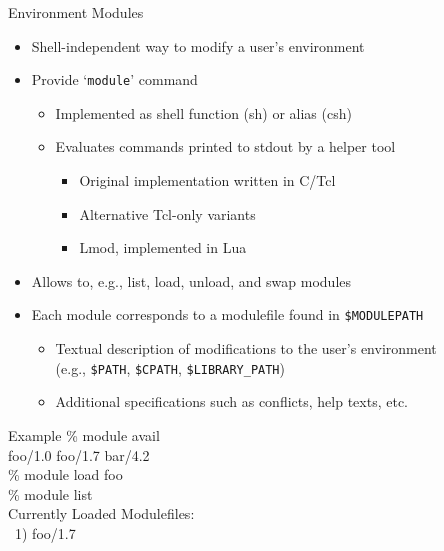 \documentclass[10pt,xcolor={usenames,dvipsnames}]{beamer}
\begin{document}
\begin{frame}{Environment Modules}
\begin{itemize}
    \item
        Shell-independent way to modify a user's environment
    \item
        Provide `\texttt{module}' command
        \begin{itemize}
            \item
                Implemented as shell function (sh) or alias (csh)
            \item
                Evaluates commands printed to stdout by a helper tool
                \begin{itemize}
                    \item
                        Original implementation written in C/Tcl
                    \item
                        Alternative Tcl-only variants
                    \item
                        Lmod, implemented in Lua
                \end{itemize}
        \end{itemize}
    \item
        Allows to, e.g., list, load, unload, and swap modules
    \item
        Each module corresponds to a modulefile found in \texttt{\$MODULEPATH}
        \begin{itemize}
            \item
                Textual description of modifications to the user's environment\\
                (e.g., \texttt{\$PATH}, \texttt{\$CPATH},
                \texttt{\$LIBRARY\_PATH})
            \item
                Additional specifications such as conflicts, help texts, etc.
        \end{itemize}
\end{itemize}
\vspace*{-5pt}
\begin{center}
    \begin{minipage}{0.9\textwidth}
        \begin{exampleblock}{Example}
            \ttfamily
            \% module avail\\
            foo/1.0 \enskip foo/1.7 \enskip bar/4.2\\
            \% module load foo\\
            \% module list\\
            Currently Loaded Modulefiles:\\
            ~1) foo/1.7
        \end{exampleblock}
    \end{minipage}
\end{center}
\end{frame}
\end{document}

